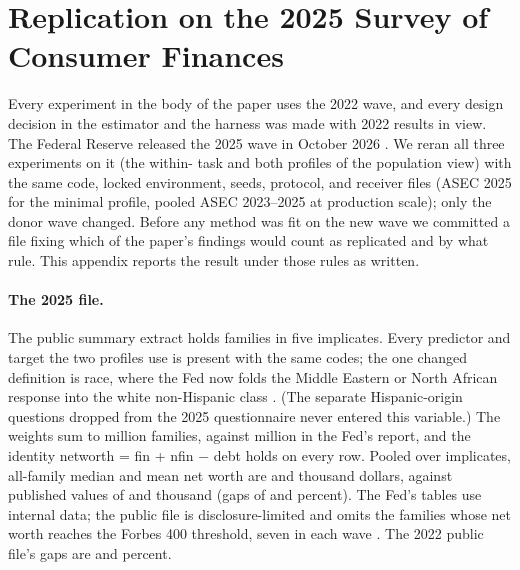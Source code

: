 \section{Replication on the 2025 Survey of Consumer Finances}
\label{app:scf2025}



Every \scf{} experiment in the body of the paper uses the 2022 wave, and
every design decision in the estimator and the harness was made with 2022
results in view. The Federal Reserve released the 2025 wave in October 2026
\citep{fed2026scf}. We reran all three \scf{} experiments on it (the
within-\scf{} task and both profiles of the population view) with the same
code, locked environment, seeds, protocol, and receiver files (ASEC 2025 for
the minimal profile, pooled ASEC 2023--2025 at production scale); only the donor
wave changed. Before any method was fit on the new wave we committed a file
fixing which of the paper's findings would count as replicated and by what
rule. This appendix reports the result under those rules as written.

\paragraph{The 2025 file.} The public summary extract holds
 families in five implicates. Every predictor and
target the two profiles use is present with the same codes; the one changed
definition is race, where the Fed now folds the Middle Eastern or North
African response into the white non-Hispanic class \citep{fed2026scf}.
(The separate Hispanic-origin questions dropped from the 2025 questionnaire
never entered this variable.) The weights sum to
 million families, against
 million in the Fed's report, and the
identity networth = fin + nfin $-$ debt holds on every row. Pooled over
implicates, all-family median and mean net worth are
 and
 thousand dollars, against published
values of  and
 thousand
(gaps of  and
 percent). The Fed's tables use internal
data; the public file is disclosure-limited and omits the families whose net
worth reaches the Forbes 400 threshold, seven in each wave
\citep{fed2026scfcodebook}. The 2022 public
file's gaps are  and
 percent.

